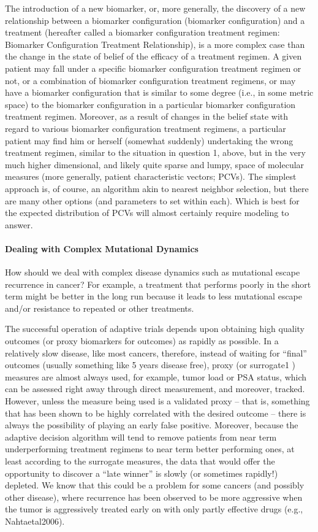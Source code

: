 \documentclass[12pt]{article}
\begin{document}
The introduction of a new biomarker, or, more generally, the discovery
of a new relationship between a biomarker configuration (biomarker
configuration) and a treatment (hereafter called a biomarker
configuration treatment regimen: Biomarker Configuration Treatment
Relationship), is a more complex case than the change in the state of
belief of the efficacy of a treatment regimen. A given patient may
fall under a specific biomarker configuration treatment regimen or
not, or a combination of biomarker configuration treatment regimens,
or may have a biomarker configuration that is similar to some degree
(i.e., in some metric space) to the biomarker configuration in a
particular biomarker configuration treatment regimen. Moreover, as a
result of changes in the belief state with regard to various biomarker
configuration treatment regimens, a particular patient may find him or
herself (somewhat suddenly) undertaking the wrong treatment regimen,
similar to the situation in question 1, above, but in the very much
higher dimensional, and likely quite sparse and lumpy, space of
molecular measures (more generally, patient characteristic vectors;
PCVs). The simplest approach is, of course, an algorithm akin to
nearest neighbor selection, but there are many other options (and
parameters to set within each). Which is best for the expected
distribution of PCVs will almost certainly require modeling to answer.

\paragraph*{Dealing with Complex Mutational Dynamics}

How should we deal with complex disease dynamics such as mutational
escape recurrence in cancer? For example, a treatment that performs
poorly in the short term might be better in the long run because it
leads to less mutational escape and/or resistance to repeated or other
treatments.

The successful operation of adaptive trials depends upon obtaining
high quality outcomes (or proxy biomarkers for outcomes) as rapidly as
possible. In a relatively slow disease, like most cancers, therefore,
instead of waiting for “final” outcomes (usually something like 5
years disease free), proxy (or surrogate1 ) measures are almost always
used, for example, tumor load or PSA status, which can be assessed
right away through direct measurement, and moreover, tracked. However,
unless the measure being used is a validated proxy – that is,
something that has been shown to be highly correlated with the desired
outcome – there is always the possibility of playing an early false
positive. Moreover, because the adaptive decision algorithm will tend
to remove patients from near term underperforming treatment regimens
to near term better performing ones, at least according to the
surrogate measures, the data that would offer the opportunity to
discover a “late winner” is slowly (or sometimes rapidly!)
depleted. We know that this could be a problem for some cancers (and
possibly other disease), where recurrence has been observed to be more
aggressive when the tumor is aggressively treated early on with only
partly effective drugs (e.g., Nahtaetal2006).
\end{document}
